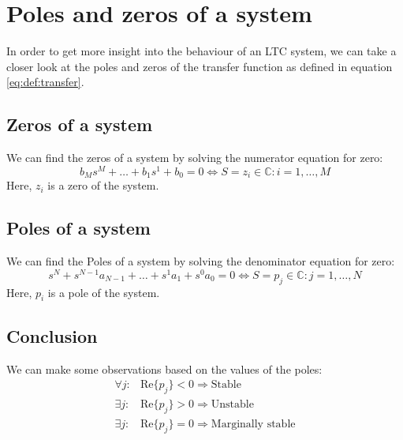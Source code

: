\documentclass[]{subfiles}
\begin{document}
	\section{Poles and zeros of a system}
	In order to get more insight into the behaviour of an LTC system, we can take a closer look at the poles and zeros of the transfer function as defined in equation \ref{eq:def:transfer}. 
	\subsection{Zeros of a system}
	We can find the zeros of a system by solving the numerator equation for zero:
	\begin{equation*}
		b_Ms^M+\ldots+b_1s^1+b_0=0 \Leftrightarrow S=z_i\in \mathbb{C}: i=1,\ldots,M
	\end{equation*}
	Here, $z_i$ is a zero of the system.
		\subsection{Poles of a system}
	We can find the Poles of a system by solving the denominator equation for zero:
	\begin{equation*}
		s^N+s^{N-1}a_{N-1}+\ldots+s^1a_1+s^0a_0=0 \Leftrightarrow S=p_j\in \mathbb{C}: j=1,\ldots,N
	\end{equation*}
	Here, $p_i$ is a pole of the system.
	\subsection{Conclusion}
	We can make some observations based on the values of the poles:
	\begin{align*}
		\forall j:& \text{Re}\{p_j\}<0 \Rightarrow \text{Stable}\\
		\exists j:& \text{Re}\{p_j\}>0 \Rightarrow \text{Unstable}\\
		\exists j:& \text{Re}\{p_j\}=0 \Rightarrow \text{Marginally stable}
	\end{align*}
\end{document}
